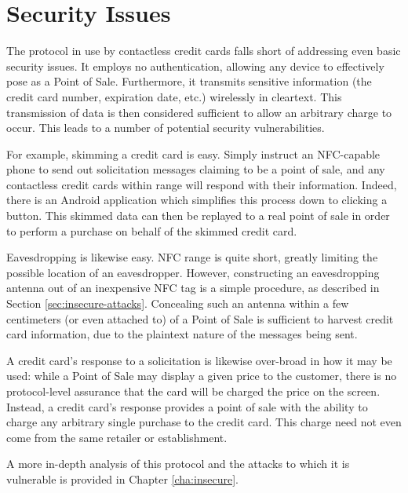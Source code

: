 \section{Security Issues}
\label{sec:intro-problem}

The protocol in use by contactless credit cards falls short of addressing even basic security issues.
It employs no authentication, allowing any device to effectively pose as a Point of Sale.
Furthermore, it transmits sensitive information (the credit card number, expiration date, etc.) wirelessly in cleartext.
This transmission of data is then considered sufficient to allow an arbitrary charge to occur.
This leads to a number of potential security vulnerabilities.

For example, skimming a credit card is easy.
Simply instruct an NFC-capable phone to send out solicitation messages claiming to be a point of sale, and any contactless credit cards within range will respond with their information.
Indeed, there is an Android application \cite{NFCProxy} which simplifies this process down to clicking a button.
This skimmed data can then be replayed to a real point of sale in order to perform a purchase on behalf of the skimmed credit card.

Eavesdropping is likewise easy.
NFC range is quite short, greatly limiting the possible location of an eavesdropper.
However, constructing an eavesdropping antenna out of an inexpensive NFC tag is a simple procedure, as described in Section \ref{sec:insecure-attacks}.
Concealing such an antenna within a few centimeters (or even attached to) of a Point of Sale is sufficient to harvest credit card information,
    due to the plaintext nature of the messages being sent.

A credit card's response to a solicitation is likewise over-broad in how it may be used:
    while a Point of Sale may display a given price to the customer, there is no protocol-level assurance that the card will be charged the price on the screen.
Instead, a credit card's response provides a point of sale with the ability to charge any arbitrary single purchase to the credit card.
This charge need not even come from the same retailer or establishment.

A more in-depth analysis of this protocol and the attacks to which it is vulnerable is provided in Chapter \ref{cha:insecure}.